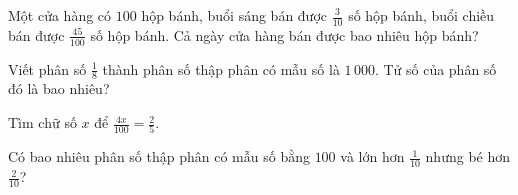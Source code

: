 \begin{ex}
  Một cửa hàng có $100$ hộp bánh, buổi sáng bán được $\frac{3}{10}$ số hộp bánh, buổi chiều bán được $\frac{45}{100}$ số hộp bánh. Cả ngày cửa hàng bán được bao nhiêu hộp bánh?
\end{ex}

\begin{ex}
  Viết phân số $\frac{1}{8}$ thành phân số thập phân có mẫu số là $1\,000$. Tử số của phân số đó là bao nhiêu?
\end{ex}

\begin{ex}
  Tìm chữ số $x$ để $\frac{4x}{100} = \frac{2}{5}$.
\end{ex}

\begin{ex}
  Có bao nhiêu phân số thập phân có mẫu số bằng $100$ và lớn hơn $\frac{1}{10}$ nhưng bé hơn $\frac{2}{10}$?
\end{ex}
